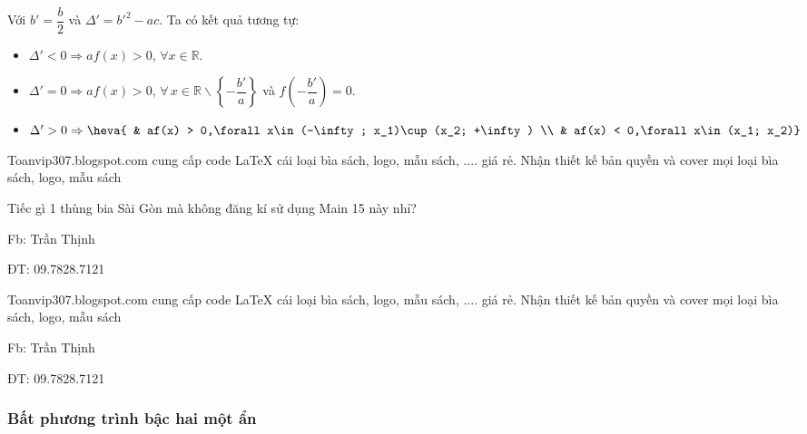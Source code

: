 \begin{tomtat}
\begin{binhluan}\\
	Với $b'=\dfrac{b}{2}$ và $\Delta'  =  b'^2  -  ac$.
	Ta có kết quả tương tự:
	\begin{itemize}
		\item $\Delta'  <  0\Rightarrow af(x)  >  0,\,\forall x\in \mathbb{R}$.
		\item $ \Delta'  =  0\Rightarrow af(x)  >  0,\,\forall\, x\in \mathbb{R}\backslash \left\{ -  \dfrac{b'}{a}\right\} $ và $f\left(-\dfrac{b'}{a}\right)=0$.
		\item $ \Delta'  >  0\Rightarrow \heva{
			& af(x)  >  0,\forall x\in (-\infty; x_1)\cup (x_2; +\infty) \\ 
			& af(x)  <  0,\forall x\in (x_1; x_2)}$
	\end{itemize}	 
\end{binhluan}
\begin{nx}
	Toanvip307.blogspot.com cung cấp code \LaTeX{} cái loại bìa sách, logo, mẫu sách, .... giá rẻ. Nhận thiết kế bản quyền và cover mọi loại bìa sách, logo, mẫu sách
\end{nx}
\begin{luuy}
	Tiếc gì 1 thùng bia Sài Gòn mà không đăng kí sử dụng Main 15 này nhỉ?
	\begin{listEX}[1]
		\item Fb: Trần Thịnh
		\item ĐT: 09.7828.7121
	\end{listEX}
\end{luuy}
\begin{tc}
	Toanvip307.blogspot.com cung cấp code \LaTeX{} cái loại bìa sách, logo, mẫu sách, .... giá rẻ. Nhận thiết kế bản quyền và cover mọi loại bìa sách, logo, mẫu sách
	\begin{listEX}[2]
		\item Fb: Trần Thịnh
		\item ĐT: 09.7828.7121
	\end{listEX}
\end{tc}




\subsubsection{Bất phương trình bậc hai một ẩn}


\end{tomtat}
